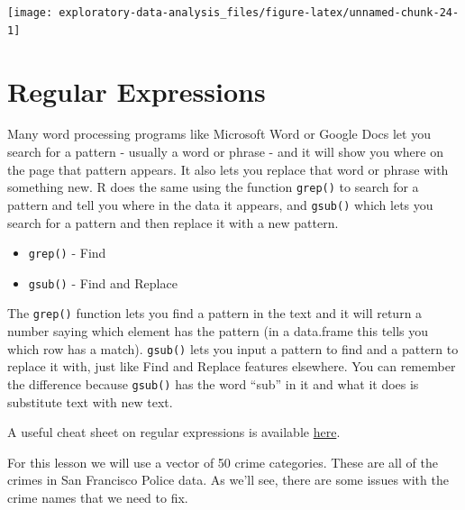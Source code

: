 \documentclass[
  12pt,
]{book}
\providecommand{\tightlist}{%
  \setlength{\itemsep}{0pt}\setlength{\parskip}{0pt}}
\begin{document}
\begin{center}\texttt{[image: exploratory-data-analysis\_files/figure-latex/unnamed-chunk-24-1]} \end{center}

\hypertarget{regular-expressions}{%
\chapter{Regular Expressions}\label{regular-expressions}}

Many word processing programs like Microsoft Word or Google Docs let you search for a pattern - usually a word or phrase - and it will show you where on the page that pattern appears. It also lets you replace that word or phrase with something new. R does the same using the function \texttt{grep()} to search for a pattern and tell you where in the data it appears, and \texttt{gsub()} which lets you search for a pattern and then replace it with a new pattern.

\begin{itemize}
\tightlist
\item
  \texttt{grep()} - Find
\item
  \texttt{gsub()} - Find and Replace
\end{itemize}

The \texttt{grep()} function lets you find a pattern in the text and it will return a number saying which element has the pattern (in a data.frame this tells you which row has a match). \texttt{gsub()} lets you input a pattern to find and a pattern to replace it with, just like Find and Replace features elsewhere. You can remember the difference because \texttt{gsub()} has the word ``sub'' in it and what it does is substitute text with new text.

A useful cheat sheet on regular expressions is available \href{https://www.rstudio.com/wp-content/uploads/2016/09/RegExCheatsheet.pdf}{here}.

For this lesson we will use a vector of 50 crime categories. These are all of the crimes in San Francisco Police data. As we'll see, there are some issues with the crime names that we need to fix.
\end{document}
